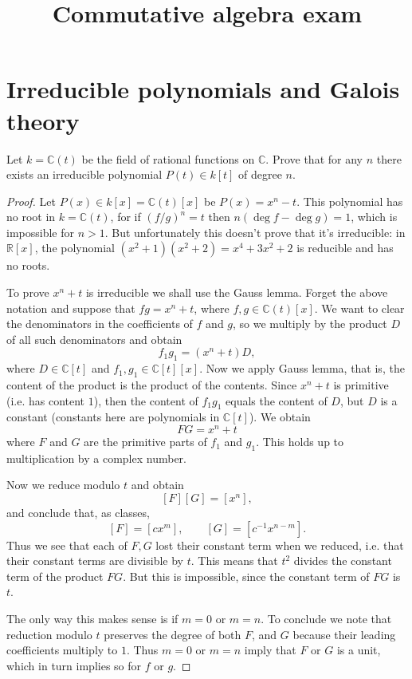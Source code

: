 



\title{Commutative algebra exam}
\maketitle

\section{Irreducible polynomials and Galois
theory}

\begin{exercise}
\label{exercise-rational-functions-irreducible}
Let $k=\mathbb{C}(t)$ be the field of
rational functions on $\mathbb{C}$.
Prove that for any $n$ there exists
an irreducible polynomial
$P(t) \in k[t]$ of degree $n$.
\end{exercise}

\begin{proof}
Let $P(x) \in k[x]=\mathbb{C}(t)[x]$
be $P(x) = x^n-t$.
This polynomial has no root in
$k=\mathbb{C}(t)$,
for if $(f/g)^n=t$ then 
$n(\operatorname{deg}f-
\operatorname{deg}g)=1$,
which is impossible for $n>1$.
But unfortunately this doesn't prove
that it's irreducible: in $\mathbb{R}[x]$,
the polynomial
$(x^2 + 1)(x^2+2)=x^4+3x^2+2$
is reducible and has no roots.

To prove $x^n + t$ is irreducible we shall
use the Gauss lemma. Forget the above
notation and suppose that
$fg = x^n + t$, where
$f,g \in \mathbb{C}(t)[x]$.
We want to clear the denominators in
the coefficients of $f$ and $g$,
so we multiply by the product $D$ of all
such denominators and obtain
$$
f_1g_1 = (x^n + t)D,
$$
where $D \in \mathbb{C}[t]$ and
$f_1,g_1 \in \mathbb{C}[t][x]$.
Now we apply Gauss lemma, that is, the
content of the product is the product
of the contents. Since $x^n +t$ is primitive
(i.e. has content $1$), then the
content of $f_1g_1$ equals the content
of $D$, but $D$ is a constant
(constants here are polynomials in
$\mathbb{C}[t]$).
We obtain
$$
FG = x^n + t
$$
where $F$ and $G$ are the primitive parts
of $f_1$ and $g_1$. This holds up to
multiplication by a complex number.

Now we reduce modulo $t$ and obtain
$$
[F][G] = [x^n],
$$
and conclude that, as classes,
$$
[F]=[cx^m],\qquad 
[G]=[c^{-1}x^{n-m}].
$$
Thus we see that each of $F,G$
lost their constant term when we reduced,
i.e. that their constant terms are divisible
by $t$. This means that $t^2$ divides
the constant term of the product $FG$.
But this is impossible, since the constant
term of $FG$ is $t$. 

The only way
this makes sense is if $m=0$ or $m=n$.
To conclude we note that reduction modulo
$t$ preserves the degree of both $F$, and 
$G$ because their leading coefficients
multiply to $1$. Thus $m=0$ or $m=n$
imply that $F$ or $G$ is a unit, which
in turn implies so for $f$ or $g$.
\end{proof}

